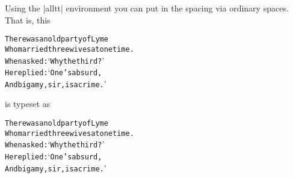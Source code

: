 \begin{comment}
   cunning \\
   old Fury; \\
   `I'll try \\
   the whole \\
   cause \\
   and \\
   condemn \\
   you \\
   to \\
   death.'  \par
 \end{patverse}
 \end{verse}
 \attrib{Lewis Carrol, \textit{Alice's Adventures in Wonderland}, 1865}
 
\clearpage
\end{comment}


 Using the |alltt| environment you can put in the spacing via ordinary
 spaces. That is, this

\begin{texexample}{}{}
 \begin{alltt}\normalfont
 There was an old party of Lyme
 Who married three wives at one time.
       When asked: `Why the third?' 
       He replied: `One's absurd, 
 And bigamy, sir, is a crime.'
 \end{alltt}
\end{texexample}

 is typeset as

 \begin{alltt}
 \normalfont
 There was an old party of Lyme
 Who married three wives at one time.
       When asked: `Why the third?' 
       He replied: `One's absurd, 
 And bigamy, sir, is a crime.'
 \end{alltt}


\begin{codeexample}[]
\end{codeexample}







